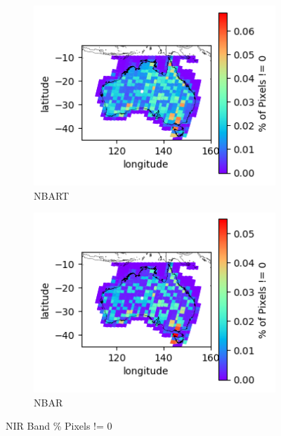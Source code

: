 \documentclass[a4paper]{article}
\begin{document}
      \begin{figure}[h!]
        \centering
          \begin{subfigure}[l]{.4\linewidth}
            \hspace{-32mm}
            \includegraphics[scale=0.9]{plots/nbart/nbart_nir-PercentDifferent.png}
            \caption{NBART}
          \end{subfigure}
%
          \begin{subfigure}[r]{.4\linewidth}
            \includegraphics[scale=0.9]{plots/nbar/nbar_nir-PercentDifferent.png}
            \caption{NBAR}
          \end{subfigure}
        \caption{NIR Band \% Pixels != 0}\label{figure:19}
      \end{figure}
\end{document}
